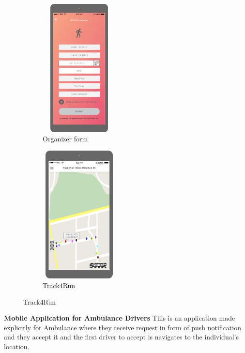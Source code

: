 \begin{figure}[H]
	\centering
	\begin{subfigure}[b]{0.4\textwidth}	
		\includegraphics[width=4cm,height=7cm]		{./RASD_Mockups/9_T-Oragnizer.png}
      	\caption{Organizer form}
        \label{TrackMe_org}
	 \end{subfigure}
     \begin{subfigure}[b]{0.4\textwidth}	
		\includegraphics[width=4cm,height=7cm]		{./RASD_Mockups/9-Track4Run.png}
      	\caption{Track4Run}
        \label{TrackMe_Track4Run}
	 \end{subfigure}
\end{figure}

\textbf{Mobile Application for Ambulance Drivers}
This is an application made explicitly for Ambulance where they receive request in form of push notification and they accept it and the first driver to accept is navigates to the individual's location.

